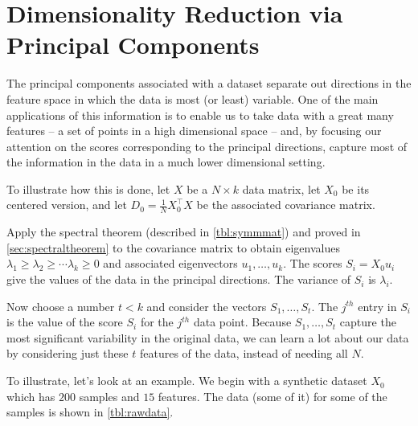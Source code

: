 \documentclass[
  oneside]{scrbook}
\begin{document}
\hypertarget{dimensionality-reduction-via-principal-components}{%
\section{Dimensionality Reduction via Principal
Components}\label{dimensionality-reduction-via-principal-components}}

The principal components associated with a dataset separate out
directions in the feature space in which the data is most (or least)
variable. One of the main applications of this information is to enable
us to take data with a great many features -- a set of points in a high
dimensional space -- and, by focusing our attention on the scores
corresponding to the principal directions, capture most of the
information in the data in a much lower dimensional setting.

To illustrate how this is done, let \(X\) be a \(N\times k\) data
matrix, let \(X_{0}\) be its centered version, and let
\(D_{0} = \frac{1}{N}X_{0}^{\intercal}X\) be the associated covariance
matrix.

Apply the spectral theorem (described in \cref{tbl:symmmat}) and proved
in \cref{sec:spectraltheorem} to the covariance matrix to obtain
eigenvalues \(\lambda_{1}\ge \lambda_{2}\ge\cdots \lambda_{k}\ge 0\) and
associated eigenvectors \(u_{1},\ldots, u_{k}\). The scores
\(S_{i}=X_{0}u_{i}\) give the values of the data in the principal
directions. The variance of \(S_{i}\) is \(\lambda_{i}\).

Now choose a number \(t<k\) and consider the vectors
\(S_{1},\ldots, S_{t}\). The \(j^{th}\) entry in \(S_{i}\) is the value
of the score \(S_{i}\) for the \(j^{th}\) data point. Because
\(S_{1},\ldots, S_{t}\) capture the most significant variability in the
original data, we can learn a lot about our data by considering just
these \(t\) features of the data, instead of needing all \(N\).

To illustrate, let's look at an example. We begin with a synthetic
dataset \(X_{0}\) which has \(200\) samples and \(15\) features. The
data (some of it) for some of the samples is shown in
\cref{tbl:rawdata}.
\end{document}
